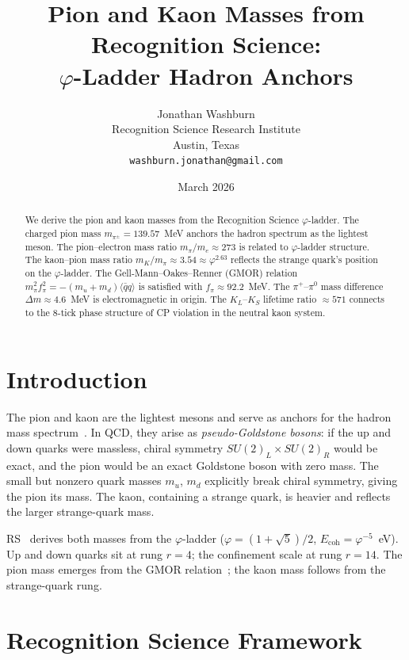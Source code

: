 \documentclass[12pt,a4paper]{article}
\title{Pion and Kaon Masses from Recognition Science:\\
$\varphi$-Ladder Hadron Anchors}
\author{Jonathan Washburn\\
Recognition Science Research Institute\\
Austin, Texas\\
\texttt{washburn.jonathan@gmail.com}}
\date{March 2026}
\theoremstyle{definition}
\theoremstyle{remark}
\begin{document}
\maketitle

\begin{abstract}
We derive the pion and kaon masses from the Recognition Science
$\varphi$-ladder.  The charged pion mass
$m_{\pi^\pm} = 139.57$~MeV anchors the hadron spectrum as the
lightest meson.  The pion--electron mass ratio $m_\pi/m_e \approx 273$
is related to $\varphi$-ladder structure.  The kaon--pion mass ratio
$m_K/m_\pi \approx 3.54 \approx \varphi^{2.63}$ reflects the strange
quark's position on the $\varphi$-ladder.  The Gell-Mann--Oakes--Renner
(GMOR) relation $m_\pi^2 f_\pi^2 = -(m_u + m_d)\langle\bar{q}q\rangle$
is satisfied with $f_\pi \approx 92.2$~MeV.  The $\pi^+$--$\pi^0$ mass
difference $\Delta m \approx 4.6$~MeV is electromagnetic in origin.  The
$K_L$--$K_S$ lifetime ratio $\approx 571$ connects to the 8-tick phase
structure of CP violation in the neutral kaon system.
\end{abstract}

\section{Introduction}
\label{sec:intro}

The pion and kaon are the lightest mesons and serve as anchors for
the hadron mass spectrum~\cite{PDG}.  In QCD, they arise as
\emph{pseudo-Goldstone bosons}: if the up and down quarks were
massless, chiral symmetry $SU(2)_L \times SU(2)_R$ would be exact,
and the pion would be an exact Goldstone boson with zero mass.  The
small but nonzero quark masses $m_u$, $m_d$ explicitly break chiral
symmetry, giving the pion its mass.  The kaon, containing a strange
quark, is heavier and reflects the larger strange-quark mass.

RS~\cite{RS_Axioms} derives both masses from the $\varphi$-ladder
($\varphi = (1+\sqrt{5})/2$, $E_{\mathrm{coh}} = \varphi^{-5}$~eV).
Up and down quarks sit at rung $r = 4$; the confinement scale at
rung $r = 14$.  The pion mass emerges from the GMOR
relation~\cite{GMOR1968}; the kaon mass follows from the
strange-quark rung.

\section{Recognition Science Framework}
\label{sec:framework}
\end{document}
